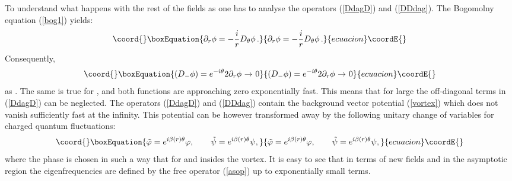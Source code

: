 \documentclass[a4paper,12pt]{article}
\begin{document}
To understand what happens with the rest of the fields as \coordHE{}
one has to analyse the operators (\ref{DdagD}) and (\ref{DDdag}).
The Bogomolny equation (\ref{bog1}) yields:
\begin{equation}\coord{}\boxEquation{
\partial_r \phi =-\frac ir D_\theta \phi \,.
}{
\partial_r \phi =-\frac ir D_\theta \phi \,.
}{ecuacion}\coordE{}\end{equation}
Consequently,
\begin{equation}\coord{}\boxEquation{
(D_-\phi )= e^{-i\theta} 2 \partial_r \phi \ {\to}\ 0
}{
(D_-\phi )= e^{-i\theta} 2 \partial_r \phi \ {\to}\ 0
}{ecuacion}\coordE{}\end{equation}
as \coordHE{}. The same is true for \coordHE{}, and both
functions are approaching zero exponentially fast. This means that
for large \coordHE{} the off-diagonal terms in (\ref{DdagD}) can be
neglected. The operators (\ref{DdagD}) and (\ref{DDdag}) contain
the background vector potential (\ref{vortex}) which does not
vanish sufficiently fast at the infinity. This potential can be
however transformed away by the following unitary change of 
variables for charged quantum fluctuations:
\begin{equation}\coord{}\boxEquation{
\tilde \varphi =e^{i\beta(r) \theta} \varphi,\qquad
\tilde \psi =e^{i\beta(r) \theta} \psi,\label{tilfiel}
}{
\tilde \varphi =e^{i\beta(r) \theta} \varphi,\qquad
\tilde \psi =e^{i\beta(r) \theta} \psi,}{ecuacion}\coordE{}\end{equation}
where the phase \coordHE{} is chosen in such a way that
\coordHE{} for \coordHE{} and \coordHE{} insides the vortex.
It is easy to see that in terms of new fields \myHighlight{$\tilde\varphi$}\coordHE{} and
\myHighlight{$\tilde\psi$}\coordHE{} in the asymptotic region the eigenfrequencies are
defined by the free operator (\ref{asop}) up to exponentially
small terms. 
\end{document}
